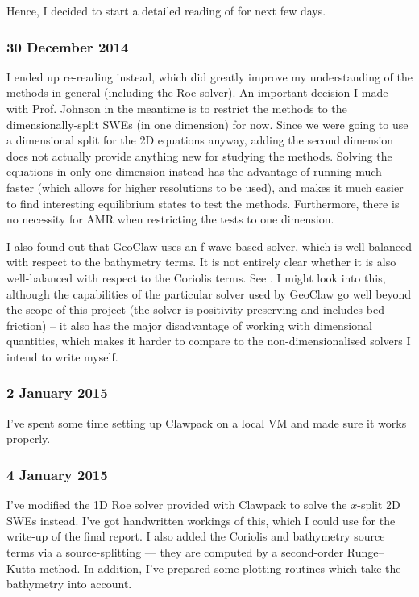 \documentclass[a4paper,onecolumn,11pt]{report}
\begin{document}
Hence, I decided to start a detailed reading of \citet{toro2001shock} for next few days.

\subsubsection*{30 December 2014}

I ended up re-reading \citet{leveque2002finite} instead, which did greatly improve my understanding of the methods in general (including the Roe solver). An important decision I made with Prof. Johnson in the meantime is to restrict the methods to the dimensionally-split SWEs (in one dimension) for now. Since we were going to use a dimensional split for the 2D equations anyway, adding the second dimension does not actually provide anything new for studying the methods. Solving the equations in only one dimension instead has the advantage of running much faster (which allows for higher resolutions to be used), and makes it much easier to find interesting equilibrium states to test the methods. Furthermore, there is no necessity for AMR when restricting the tests to one dimension.

I also found out that GeoClaw uses an f-wave based solver, which is well-balanced with respect to the bathymetry terms. It is not entirely clear whether it is also well-balanced with respect to the Coriolis terms. See \citet{berger2011geoclaw}. I might look into this, although the capabilities of the particular solver used by GeoClaw go well beyond the scope of this project (the solver is positivity-preserving and includes bed friction) -- it also has the major disadvantage of working with dimensional quantities, which makes it harder to compare to the non-dimensionalised solvers I intend to write myself.

\subsubsection*{2 January 2015}

I've spent some time setting up Clawpack on a local VM and made sure it works properly.

\subsubsection*{4 January 2015}

I've modified the 1D Roe solver provided with Clawpack to solve the $x$-split 2D SWEs instead. I've got handwritten workings of this, which I could use for the write-up of the final report. I also added the Coriolis and bathymetry source terms via a source-splitting --- they are computed by a second-order Runge--Kutta method. In addition, I've prepared some plotting routines which take the bathymetry into account.
\end{document}
